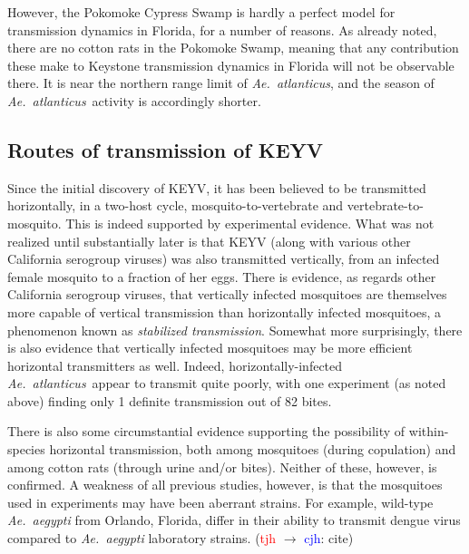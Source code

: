 \documentclass[12pt]{article}
\newcommand{\atl}{\textit{Ae.\ atlanticus}}
\newcommand{\cjh}{\textcolor{blue}{cjh}}
\newcommand{\tjh}{\textcolor{red}{tjh}}
\newcommand{\msg}[3]{(#1 $\rightarrow$ #2: #3)}
\newcommand{\mcc}[1]{\msg\cjh\cjh{#1}}
\newcommand{\mtc}[1]{\msg\tjh\cjh{#1}}
\begin{document}

                However, the Pokomoke Cypress Swamp is hardly a perfect model for transmission dynamics in Florida, for a number of reasons. As already noted, there are no cotton rats in the Pokomoke Swamp, meaning that any contribution these make to Keystone transmission dynamics in Florida will not be observable there. It is near the northern range limit of \atl, and the season of \atl\ activity is accordingly shorter.

        \subsection{Routes of transmission of KEYV}
            \label{transmission-routes}
            Since the initial discovery of KEYV, it has been believed to be transmitted horizontally, in a two-host cycle, mosquito-to-vertebrate and vertebrate-to-mosquito. This is indeed supported by experimental evidence. What was not realized until substantially later is that KEYV (along with various other California serogroup viruses) was also transmitted vertically, from an infected female mosquito to a fraction of her eggs. There is evidence, as regards other California serogroup viruses, that vertically infected mosquitoes are themselves more capable of vertical transmission than horizontally infected mosquitoes, a phenomenon known as \textit{stabilized transmission}. Somewhat more surprisingly, there is also evidence that vertically infected mosquitoes may be more efficient horizontal transmitters as well. Indeed, horizontally-infected \atl\ appear to transmit quite poorly, with one experiment (as noted above) finding only 1 definite transmission out of 82 bites.\cite{watts1988maintenance}

            There is also some circumstantial evidence supporting the possibility of within-species horizontal transmission, both among mosquitoes (during copulation)\cite{asdf} and among cotton rats (through urine and/or bites)\cite{taylor1971california}. Neither of these, however, is confirmed. A weakness of all previous studies, however, is that the mosquitoes used in experiments may have been aberrant strains.  For example, wild-type \emph{Ae.\ aegypti} from Orlando, Florida, differ in their ability to transmit dengue virus compared to \emph{Ae.\ aegypti} laboratory strains. \mtc{cite}
\end{document}
